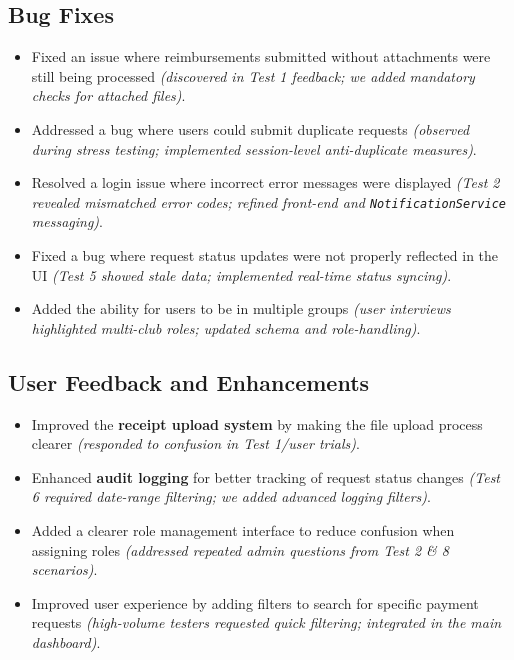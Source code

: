 \documentclass[12pt, titlepage]{article}
\begin{document}
\subsection{Bug Fixes}
\begin{itemize}
  \item Fixed an issue where reimbursements submitted without attachments were 
  still being processed 
  \emph{(discovered in Test 1 feedback; we added mandatory checks for 
  attached files)}.
  \item Addressed a bug where users could submit duplicate requests 
  \emph{(observed during stress testing; implemented session-level 
  anti-duplicate measures)}.
  \item Resolved a login issue where incorrect error messages were displayed 
  \emph{(Test 2 revealed mismatched error codes; refined front-end and 
  \texttt{NotificationService} messaging)}.
  \item Fixed a bug where request status updates were not properly reflected in 
  the UI \emph{(Test 5 showed stale data; implemented real-time status syncing)}.
  \item Added the ability for users to be in multiple groups 
  \emph{(user interviews highlighted multi-club roles; updated schema and 
  role-handling)}.
\end{itemize}



\subsection{User Feedback and Enhancements}
\begin{itemize}
  \item Improved the \textbf{receipt upload system} by making the file upload 
  process clearer 
  \emph{(responded to confusion in Test 1\slash user trials)}.
  \item Enhanced \textbf{audit logging} for better tracking of request status 
  changes 
  \emph{(Test 6 required date-range filtering; we added advanced logging filters)}.
  \item Added a clearer role management interface to reduce confusion when 
  assigning roles 
  \emph{(addressed repeated admin questions from Test 2 \& 8 scenarios)}.
  \item Improved user experience by adding filters to search for specific 
  payment requests 
  \emph{(high-volume testers requested quick filtering; integrated in the 
  main dashboard)}.
\end{itemize}
\end{document}
